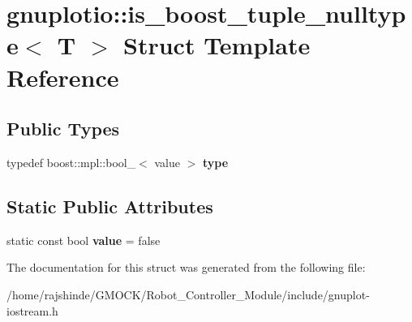 \hypertarget{structgnuplotio_1_1is__boost__tuple__nulltype}{}\section{gnuplotio\+:\+:is\+\_\+boost\+\_\+tuple\+\_\+nulltype$<$ T $>$ Struct Template Reference}
\label{structgnuplotio_1_1is__boost__tuple__nulltype}
\subsection*{Public Types}
\begin{DoxyCompactItemize}
\item 
typedef boost\+::mpl\+::bool\+\_\+$<$ value $>$ {\bfseries type}\hypertarget{structgnuplotio_1_1is__boost__tuple__nulltype_a6b9e2eaadcaa5c788131d4e9e4186349}{}\label{structgnuplotio_1_1is__boost__tuple__nulltype_a6b9e2eaadcaa5c788131d4e9e4186349}

\end{DoxyCompactItemize}
\subsection*{Static Public Attributes}
\begin{DoxyCompactItemize}
\item 
static const bool {\bfseries value} = false\hypertarget{structgnuplotio_1_1is__boost__tuple__nulltype_aed42a98e58eb94c7ba55ea7d2a8f7fd2}{}\label{structgnuplotio_1_1is__boost__tuple__nulltype_aed42a98e58eb94c7ba55ea7d2a8f7fd2}

\end{DoxyCompactItemize}


The documentation for this struct was generated from the following file\+:\begin{DoxyCompactItemize}
\item 
/home/rajshinde/\+G\+M\+O\+C\+K/\+Robot\+\_\+\+Controller\+\_\+\+Module/include/gnuplot-\/iostream.\+h\end{DoxyCompactItemize}
